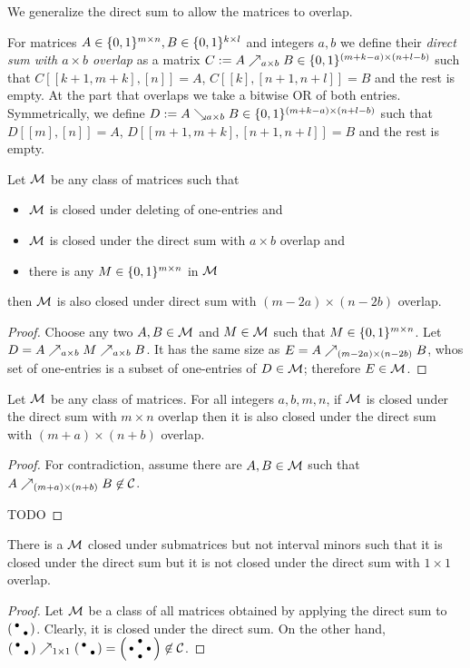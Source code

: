 We generalize the direct sum to allow the matrices to overlap.

\begin{defn}
For matrices $A\in\{0,1\}^{m\times n},B\in\{0,1\}^{k\times l}$ and integers $a,b$ we define their \emph{direct sum with $a\times b$ overlap} as a matrix $C:=A\nearrow_{a\times b}B\in\{0,1\}^{(m+k-a)\times(n+l-b)}$ such that $C[[k+1,m+k],[n]]=A$, $C[[k],[n+1,n+l]]=B$ and the rest is empty. At the part that overlaps we take a bitwise OR of both entries. Symmetrically, we define $D:=A\searrow_{a\times b}B\in\{0,1\}^{(m+k-a)\times(n+l-b)}$ such that $D[[m],[n]]=A$, $D[[m+1,m+k],[n+1,n+l]]=B$ and the rest is empty.
\end{defn}

\begin{thm}
Let $\mathcal{M}$ be any class of matrices such that
\begin{itemize}
\item $\mathcal{M}$ is closed under deleting of one-entries and
\item $\mathcal{M}$ is closed under the direct sum with $a\times b$ overlap and
\item there is any $M\in\{0,1\}^{m\times n}$ in $\mathcal{M}$
\end{itemize}
then $\mathcal{M}$ is also closed under direct sum with $(m-2a)\times(n-2b)$ overlap.
\end{thm}
\begin{proof}
Choose any two $A,B\in\mathcal{M}$ and $M\in\mathcal{M}$ such that $M\in\{0,1\}^{m\times n}$. Let $D=A\nearrow_{a\times b}M\nearrow_{a\times b}B$. It has the same size as $E=A\nearrow_{(m-2a)\times(n-2b)}B$, whos set of one-entries is a subset of one-entries of $D\in\mathcal{M}$; therefore $E\in\mathcal{M}$.
\end{proof}

\begin{thm}
\label{thm:hered}
Let $\mathcal{M}$ be any class of matrices. For all integers $a,b,m,n$, if $\mathcal{M}$ is closed under the direct sum with $m\times n$ overlap then it is also closed under the direct sum with $(m+a)\times(n+b)$ overlap.
\end{thm}
\begin{proof}
For contradiction, assume there are $A,B\in\mathcal{M}$ such that $A\nearrow_{(m+a)\times(n+b)}B\not\in\mathcal{C}$.

TODO
\end{proof}

\begin{obs}
There is a $\mathcal{M}$ closed under submatrices but not interval minors such that it is closed under the direct sum but it is not closed under the direct sum with $1\times1$ overlap.
\end{obs}
\begin{proof}
Let $\mathcal{M}$ be a class of all matrices obtained by applying the direct sum to $\left(\begin{smallmatrix}\bullet& \\\ &\bullet\end{smallmatrix}\right)$. Clearly, it is closed under the direct sum. On the other hand, $\smm{\bullet& \\\ &\bullet}\dsum_{1\times1}\smm{\bullet& \\\ &\bullet}=\smm{ &\bullet& \\\bullet& &\bullet\\ &\bullet& }\not\in\class{C}$.
\end{proof}

